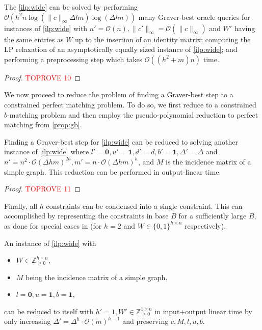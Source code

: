 \documentclass[a4paper,UKenglish,cleveref,thm-restate]{lipics-v2021}
\newcommand{\Z}{\mathbb Z}
\newcommand{\veczero}{\mathbf0}
\newcommand{\vecone}{\mathbf1}
\renewcommand{\O}{\mathcal O}
\begin{document}
\begin{lemma}
    The \cref{ilp:wide} can be solved by performing $\O(h^2n\log(\|c\|_\infty\Delta hn)\log(\Delta hn))$ many Graver-best oracle queries for instances of \cref{ilp:wide} with $n'=\O(n),\|c'\|_\infty=\O(\|c\|_\infty)$ and $W'$ having the same entries as $W$ up to the insertion of an identity matrix; computing the LP relaxation of an asymptotically equally sized instance of \cref{ilp:wide}; and performing a preprocessing step which takes $\O((h^2+m)n)$ time.
    \label{lemma:graver-best-step-count}
\end{lemma}

\begin{proof}\textcolor{red}{TOPROVE 10}\end{proof}

We now proceed to reduce the problem of finding a Graver-best step to a constrained perfect matching problem. To do so, we first reduce to a constrained $b$-matching problem and then employ the pseudo-polynomial reduction to perfect matching from \cref{prop:gb}.

\begin{lemma}
    Finding a Graver-best step for \cref{ilp:wide} can be reduced to solving another instance of \cref{ilp:wide} where $l'=\veczero,u'=\vecone,d'=d,b'=\vecone,\Delta'=\Delta$ and $n'=n^2\cdot\O(\Delta hm)^{2h},m'=n\cdot\O(\Delta hm)^h$, and $M$ is the incidence matrix of a simple graph. This reduction can be performed in output-linear time.
    \label{lemma:wide-ip-reduction-to-perfect-matching}
\end{lemma}

\begin{proof}\textcolor{red}{TOPROVE 11}\end{proof}

Finally, all $h$ constraints can be condensed into a single constraint. This can accomplished by representing the constraints in base $B$ for a sufficiently large $B$, as done for special cases in \cite{DBLP:journals/mp/BergerBGS11,DBLP:journals/jacm/PapadimitriouY82} (for $h=2$ and $W\in\{0,1\}^{h\times n}$ respectively).

\begin{lemma}
    An instance of \cref{ilp:wide} with
    \begin{itemize}
        \item $W\in\Z_{\ge0}^{h\times n}$,
        \item $M$ being the incidence matrix of a simple graph,
        \item $l=\veczero,u=\vecone,b=\vecone$,
    \end{itemize}
    can be reduced to itself with $h'=1,W'\in\Z_{\ge0}^{1\times n}$ in input+output linear time by only increasing $\Delta'=\Delta^h\cdot\O(m)^{h-1}$ and preserving $c,M,l,u,b$.
    \label{lemma:constraint-condensation}
\end{lemma}
\end{document}
